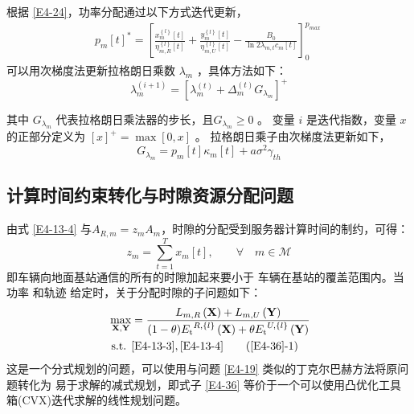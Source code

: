 根据 \eqref{E4-24}，功率分配通过以下方式迭代更新，
\begin{align} \label{E4-26}
{{p}_{m}}{{\left[ t \right]}^{*}}=\left[ \frac{x_{m}^{\left\{ l \right\}}\left[ t \right]}{\eta _{m,R}^{\left\{ l \right\}}\left[ t \right]}+\frac{y_{m}^{\left\{ l \right\}}\left[ t \right]}{\eta _{m,U}^{\left\{ l \right\}}\left[ t \right]}-\frac{{{B}_{0}}}{\ln 2{{\lambda }_{m,t}}{{c}_{m}}\left[ t \right]} \right]_{0}^{{{p}_{max}}\ }
\end{align}
可以用次梯度法更新拉格朗日乘数 $\lambda_m$ ，具体方法如下：
\begin{equation}\label{E4-27}
\lambda _{m}^{\left( i+1 \right)}={{\left[ \lambda _{m}^{\left( t \right)}+\Delta _{m}^{\left( t \right)}{{G}_{{{\lambda}_{m}}}} \right]}^{+}}
\end{equation}

其中 ${{G}_{{{\lambda}_{m}}}}$ 代表拉格朗日乘法器的步长，且${{G}_{{{\lambda}_{m}}}}\geq0$ 。
变量 $i$ 是迭代指数，变量 $x$ 的正部分定义为 $\left[x\right]^+=\max{\left[0,x\right]} $ 。
拉格朗日乘子由次梯度法更新如下，
\begin{equation}\label{E4-28}
{{G}_{{{\lambda }_{m}}}}={{p}_{m}}\left[ t \right]{{\kappa }_{m}}\left[ t \right]+a{{\sigma }^{2}}{{\gamma }_{th}}
\end{equation}
\subsection{计算时间约束转化与时隙资源分配问题}\label{section4-3-3}
由式 \eqref{E4-13-4} 与$A_{R,m}={{z}_{m}}A_m$，时隙的分配受到服务器计算时间的制约，可得：
\begin{equation} \label{E4-35}
{{z}_{m}}=\underset{t=1}{\overset{T}{\mathop{\sum }}}{{x}_{m}}\left[ t \right]   ,\qquad\forall \!\!\!\!\!\! \quad m \in \mathcal{M}
\end{equation}
即车辆向地面基站通信的所有的时隙加起来要小于
车辆在基站的覆盖范围内。当功率 和轨迹 {}给定时，关于分配时隙的子问题如下：
\begin{align} \label{E4-36}
\max _{ \mathbf{X},\mathbf{Y}}  &  ={\frac{{{L}_{m,R}\left( \mathbf{X} \right)+{{L}_{m,U}}\left( \mathbf{Y} \right)}}
{(1-\theta){{E}_{\text{t}}}^{R,\left\{ l \right\}}\left( \mathbf{X} \right)+\theta{{E}_{\text{t}}}^{U,\left\{ l \right\}}\left( \mathbf{Y} \right)}}     \\
\text { s.t. }
& \eqref{E4-13-3},\eqref{E4-13-4}                                                        \tag{\ref{E4-36}{-1}}           \label{E4-36-1}
\end{align}
这是一个分式规划的问题，可以使用与问题 \eqref{E4-19} 类似的丁克尔巴赫方法将原问题转化为
易于求解的减式规划，即式子 \eqref{E4-36} 等价于一个可以使用凸优化工具箱(CVX)迭代求解的线性规划问题。
